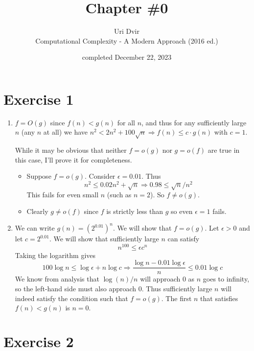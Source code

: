 \documentclass[12pt]{article}
\title{Chapter \#0}
\author{Uri Dvir \\ Computational Complexity - A Modern Approach (2016 ed.)}
\date{completed December 22, 2023}
\begin{document}
\maketitle

\section*{Exercise 1}

\begin{enumerate}
\item{
$f = O(g)$ since $f(n) < g(n)$ for all $n$, and thus for any sufficiently large $n$ (any $n$ at all) we have $n^2 < 2n^2 + 100\sqrt{n} \Rightarrow f(n) \leq c \cdot g(n)$ with $c = 1$.

\noindent
While it may be obvious that neither $f = o(g)$ nor $g = o(f)$ are true in this case, I'll prove it for completeness.
\begin{itemize}
\item{Suppose $f = o(g)$. Consider $\epsilon = 0.01$. Thus
$$
n^2 \leq 0.02n^2 + \sqrt{n} \Rightarrow 0.98 \leq \sqrt{n}/n^2
$$
This fails for even small $n$ (such as $n=2$). So $f \neq o(g)$.}
\item{Clearly $g \neq o(f)$ since $f$ is strictly less than $g$ so even $\epsilon = 1$ fails.}
\end{itemize}
}
\item{
We can write $g(n) = (2^{0.01})^n$. We will show that $f = o(g)$. Let $\epsilon > 0$ and let $c = 2^{0.01}$. We will show that sufficiently large $n$ can satisfy
$$
n^{100} \leq \epsilon c^n
$$
Taking the logarithm gives
$$
100 \log n \leq \log \epsilon + n \log c
\Rightarrow
\frac{\log n - 0.01 \log \epsilon}{n} \leq 0.01\log c
$$
We know from analysis that $\log(n)/n$ will approach 0 as $n$ goes to infinity, so the left-hand side must also approach 0. Thus sufficiently large $n$ will indeed satisfy the condition such that $f = o(g)$. The first $n$ that satisfies $f(n) < g(n)$ is $n=0$.
}
\end{enumerate}

\section*{Exercise 2}
\end{document}
